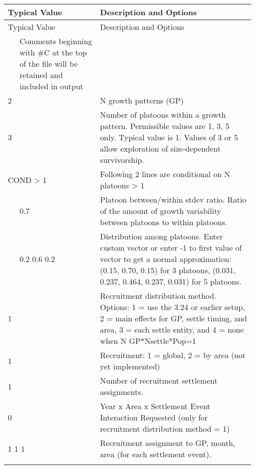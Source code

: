 \begin{center}

	\begin{longtable}{p{0.5cm} p{2cm} p{12cm}}

		\multicolumn{2}{l}{Typical Value} & Description and Options\\
		\hline
		\endfirsthead

		\multicolumn{2}{l}{Typical Value} & Description and Options\\
		\hline
		\endhead

		\hline
		\endfoot

		\endlastfoot

		\multicolumn{2}{l}{\#C comment } & Comments beginning with \#C at the top of the file will be retained and included in output  \\
		\hline

		2 & & N growth patterns (GP)  \\

		3 & & Number of platoons within a growth pattern. Permissible values are 1, 3, 5 only.  Typical value is 1.  Values of 3 or 5 allow exploration of size-dependent survivorship. \\
		\hline

		\multicolumn{2}{l}{COND > 1}& \multicolumn{1}{l}{\parbox{12cm}{Following 2 lines are conditional on N platoons > 1}} \\

		& 0.7 & Platoon between/within stdev ratio. Ratio of the amount of growth variability between platoons to within platoons.\\

		& 0.2 0.6 0.2 & Distribution among platoons. Enter custom vector or enter -1 to first value of vector to get a normal approximation: (0.15, 0.70, 0.15) for 3 platoons, (0.031, 0.237, 0.464, 0.237, 0.031) for 5 platoons.\\
		\hline

		1 & & Recruitment distribution method.  Options: 1 = use the 3.24 or earlier setup, 2 = main effects for GP, settle timing, and area, 3 = each settle entity, and 4 = none when N GP*Nsettle*Pop=1\\

		1 & & Recruitment: 1 = global, 2 = by area (not yet implemented)\\
		1 & & Number of recruitment settlement assignments.\\
		0 & & Year x Area x Settlement Event Interaction Requested (only for recruitment distribution method = 1)\\
		\multicolumn{2}{l}{1 1 1}& \multicolumn{1}{l}{\multirow{1}{12cm}[-0.1cm]{\parbox{12.5cm}{Recruitment assignment to GP, month, area (for each settlement event).}}}\\
		\\
		\hline	


\end{longtable}
\end{center}

